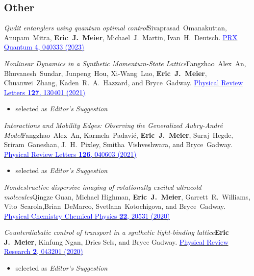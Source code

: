 \documentclass[12pt,letterpaper,sans]{moderncv}
\newcommand*{\paper}[4]{\textit{#1}\newline #2. \newline\href{#3}{\textcolor{blue}{#4}}}
\begin{document}
\subsection{Other}

\begin{etaremune}[topsep=0pt,itemsep=4pt,partopsep=0pt,parsep=0pt]

\item \paper{Qudit entanglers using quantum optimal control}{Sivaprasad~Omanakuttan, Anupam~Mitra, \textbf{Eric~J.~Meier}, Michael~J.~Martin, Ivan~H.~Deutsch}{https://journals.aps.org/prxquantum/abstract/10.1103/PRXQuantum.4.040333}{PRX Quantum 4, 040333 (2023)}

\item \paper{Nonlinear Dynamics in a Synthetic Momentum-State Lattice}{Fangzhao~Alex~An, Bhuvanesh~Sundar, Junpeng~Hou, Xi-Wang~Luo, \textbf{Eric~J.~Meier}, Chuanwei~Zhang, Kaden~R.~A.~Hazzard, and Bryce~Gadway}{https://journals.aps.org/prl/abstract/10.1103/PhysRevLett.127.130401}{Physical Review Letters \textbf{127}, 130401 (2021)}
\begin{itemize}
\item selected as \emph{Editor's Suggestion}
\end{itemize}

\item \paper{Interactions and Mobility Edges: Observing the Generalized Aubry-Andr{\'e} Model}{Fangzhao~Alex~An, Karmela~Padavi{\'c}, \textbf{Eric~J.~Meier}, Suraj~Hegde, Sriram~Ganeshan, J.~H.~Pixley, Smitha~Vishveshwara, and Bryce~Gadway}{https://journals.aps.org/prl/abstract/10.1103/PhysRevLett.126.040603}{Physical Review Letters \textbf{126}, 040603 (2021)}
\begin{itemize}
\item selected as \emph{Editor's Suggestion}
\end{itemize}

\item \paper{Nondestructive dispersive imaging of rotationally excited ultracold molecules}{Qingze Guan, Michael Highman, \textbf{Eric~J.~Meier}, Garrett~R.~Williams, Vito~Scarola,\newline Brian~DeMarco, Svetlana~Kotochigova, and Bryce~Gadway}{http://dx.doi.org/10.1039/D0CP03419C}{Physical Chemistry Chemical Physics \textbf{22}, 20531 (2020)}

\item \paper{Counterdiabatic control of transport in a synthetic tight-binding lattice}{\textbf{Eric J.\ Meier}, Kinfung Ngan, Dries Sels, and Bryce Gadway}{https://journals.aps.org/prresearch/abstract/10.1103/PhysRevResearch.2.043201}{Physical Review Research \textbf{2}, 043201 (2020)}
\begin{itemize}
\item selected as \emph{Editor's Suggestion}
\end{itemize}


\end{etaremune}
\end{document}
